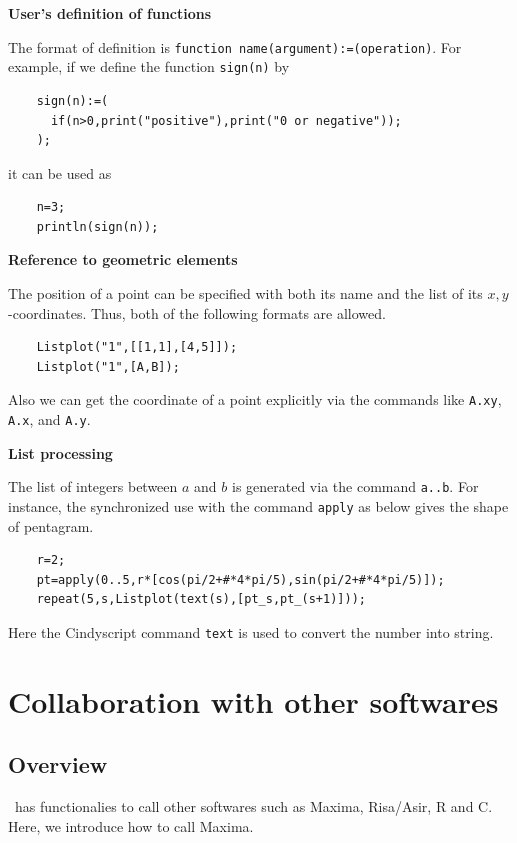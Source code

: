 \documentclass[papersize,a4paper,12pt]{article}
\begin{document}
\noindent
{\bf User's definition of functions}

\noindent
The format of definition is \verb|function name(argument):=(operation)|. 
For example, if we define the function \verb|sign(n)| by 
\begin{verbatim}
    sign(n):=(
      if(n>0,print("positive"),print("0 or negative"));
    );
\end{verbatim}
it can be used as 
\begin{verbatim}
    n=3;
    println(sign(n));
\end{verbatim}

\mbox{} 

\noindent
{\bf Reference to geometric elements}

\noindent
The position of a point can be specified 
with both its name and the list of its $x,y$-coordinates. 
Thus, both of the following formats are allowed. 
\begin{verbatim}
    Listplot("1",[[1,1],[4,5]]);
    Listplot("1",[A,B]);
\end{verbatim}
Also we can get the coordinate of a point explicitly 
via the commands 
like \verb|A.xy|, \verb|A.x|, and \verb|A.y|.

\mbox{} 

\noindent
{\bf List processing}

\noindent
The list of integers between $a$ and $b$ 
is generated via the command \verb|a..b|. 
For instance, the synchronized use with the command \verb|apply| 
as below gives the shape of pentagram. 
\begin{verbatim}
    r=2;
    pt=apply(0..5,r*[cos(pi/2+#*4*pi/5),sin(pi/2+#*4*pi/5)]);
    repeat(5,s,Listplot(text(s),[pt_s,pt_(s+1)]));
\end{verbatim}
Here the Cindyscript command \verb|text| 
is used to convert the number into string. 




\newpage

\section{Collaboration with other softwares}

\subsection{Overview}

\ketcindy\ has functionalies to call other softwares such as Maxima, Risa/Asir, R and C.
Here, we introduce how to call Maxima.\vspace{1mm}
\end{document}
